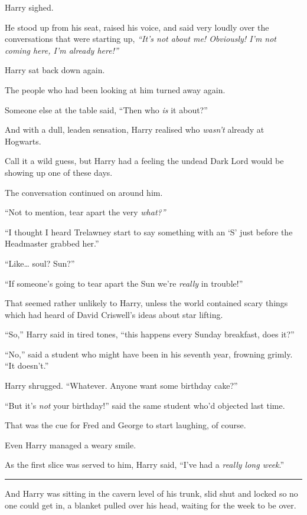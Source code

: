Harry sighed.

He stood up from his seat, raised his voice, and said very loudly over
the conversations that were starting up, \emph{``It's not about me!
Obviously! I'm not coming here, I'm already here!''}

Harry sat back down again.

The people who had been looking at him turned away again.

Someone else at the table said, ``Then who \emph{is} it about?''

And with a dull, leaden sensation, Harry realised who \emph{wasn't}
already at Hogwarts.

Call it a wild guess, but Harry had a feeling the undead Dark Lord would
be showing up one of these days.

The conversation continued on around him.

``Not to mention, tear apart the very \emph{what?''}

``I thought I heard Trelawney start to say something with an `S' just
before the Headmaster grabbed her.''

``Like\ldots{} soul? Sun?''

``If someone's going to tear apart the Sun we're \emph{really} in
trouble!''

That seemed rather unlikely to Harry, unless the world contained scary
things which had heard of David Criswell's ideas about star lifting.

``So,'' Harry said in tired tones, ``this happens every Sunday
breakfast, does it?''

``No,'' said a student who might have been in his seventh year, frowning
grimly. ``It doesn't.''

Harry shrugged. ``Whatever. Anyone want some birthday cake?''

``But it's \emph{not} your birthday!'' said the same student who'd
objected last time.

That was the cue for Fred and George to start laughing, of course.

Even Harry managed a weary smile.

As the first slice was served to him, Harry said, ``I've had a
\emph{really long week}.''

\begin{center}\rule{3in}{0.4pt}\end{center}

And Harry was sitting in the cavern level of his trunk, slid shut and
locked so no one could get in, a blanket pulled over his head, waiting
for the week to be over.

